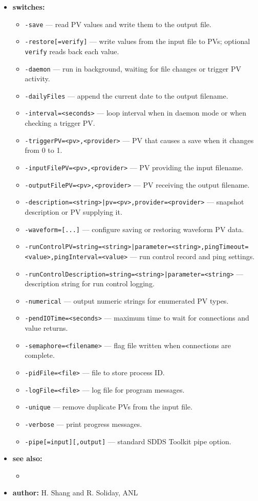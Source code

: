 \begin{itemize}
\item {\bf switches:}
  \begin{itemize}
  \item {\tt -save} --- read PV values and write them to the output file.
  \item {\tt -restore[=verify]} --- write values from the input file to PVs; optional {\tt verify} reads back each value.
  \item {\tt -daemon} --- run in background, waiting for file changes or trigger PV activity.
  \item {\tt -dailyFiles} --- append the current date to the output filename.
  \item {\tt -interval=<seconds>} --- loop interval when in daemon mode or when checking a trigger PV.
  \item {\tt -triggerPV=<pv>,<provider>} --- PV that causes a save when it changes from 0 to 1.
  \item {\tt -inputFilePV=<pv>,<provider>} --- PV providing the input filename.
  \item {\tt -outputFilePV=<pv>,<provider>} --- PV receiving the output filename.
  \item {\tt -description=<string>|pv=<pv>,provider=<provider>} --- snapshot description or PV supplying it.
  \item {\tt -waveform=[...]} --- configure saving or restoring waveform PV data.
  \item {\tt -runControlPV={string=<string>|parameter=<string>},pingTimeout=<value>,pingInterval=<value>} --- run control record and ping settings.
  \item {\tt -runControlDescription={string=<string>|parameter=<string>}} --- description string for run control logging.
  \item {\tt -numerical} --- output numeric strings for enumerated PV types.
  \item {\tt -pendIOTime=<seconds>} --- maximum time to wait for connections and value returns.
  \item {\tt -semaphore=<filename>} --- flag file written when connections are complete.
  \item {\tt -pidFile=<file>} --- file to store process ID.
  \item {\tt -logFile=<file>} --- log file for program messages.
  \item {\tt -unique} --- remove duplicate PVs from the input file.
  \item {\tt -verbose} --- print progress messages.
  \item {\tt -pipe[=input][,output]} --- standard SDDS Toolkit pipe option.
  \end{itemize}
\item {\bf see also:}
  \begin{itemize}
  \item {}
  \end{itemize}
\item {\bf author:} H. Shang and R. Soliday, ANL
\end{itemize}
